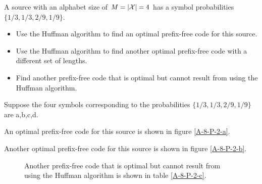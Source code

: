 \documentclass{assignment}
\begin{document}
\begin{prob}[2.12]
    A source with an alphabet size of $M=\left\lvert\mathcal{X}\right\rvert=4$ has a symbol probabilities $\{1/3,1/3,2/9,1/9\}$.
    \begin{itemize}
        \item[(a)] Use the Huffman algorithm to find an optimal prefix-free code for this source.
        \item[(b)] Use the Huffman algorithm to find another optimal prefix-free code with a different set of lengths.
        \item[(c)] Find another prefix-free code that is optimal but cannot result from using the Huffman algorithm.
    \end{itemize}
\end{prob}
\begin{sol}
    \begin{itemize}
        Suppose the four symbols corresponding to the probabilities $\{1/3,1/3,2/9,1/9\}$ are a,b,c,d.
        \item[(a)] An optimal prefix-free code for this source is shown in figure \ref{A-8-P-2-a}.
        \item[(b)] Another optimal prefix-free code for this source is shown in figure \ref{A-8-P-2-b}.
        \begin{figure}[h]
            \centering
            \item[(c)] Another prefix-free code that is optimal but cannot result from using the Huffman algorithm is shown in table \ref{A-8-P-2-c}.

\end{figure}
\end{itemize}
\end{sol}
\end{document}
